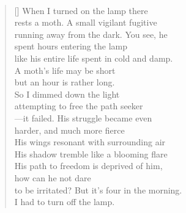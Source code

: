 \documentclass{book}
\begin{document}
\newpage
\poemtitle{\textcolor[RGB]{175,25,25}{The lamp of freedom}}
\hspace*{\fill} \\
\settowidth{\versewidth}{to be irritated? But it's four in the morning.}
\begin{verse}[\versewidth]
    When I turned on the lamp there\\
    rests a moth. A small vigilant fugitive\\
    running away from the dark. You see, he\\
    spent hours entering the lamp\\
    like his entire life spent in cold and damp.\\
    A moth's life may be short\\
    but an hour is rather long.\\
    So I dimmed down the light\\
    attempting to free the path seeker\\
    ---it failed. His struggle became even\\
    harder, and much more fierce\\
    His wings resonant with surrounding air\\
    His shadow tremble like a blooming flare\\
    His path to freedom is deprived of him, \\
    how can he not dare\\
    to be irritated? But it's four in the morning.\\
    I had to turn off the lamp.\\
\end{verse}
\end{document}
